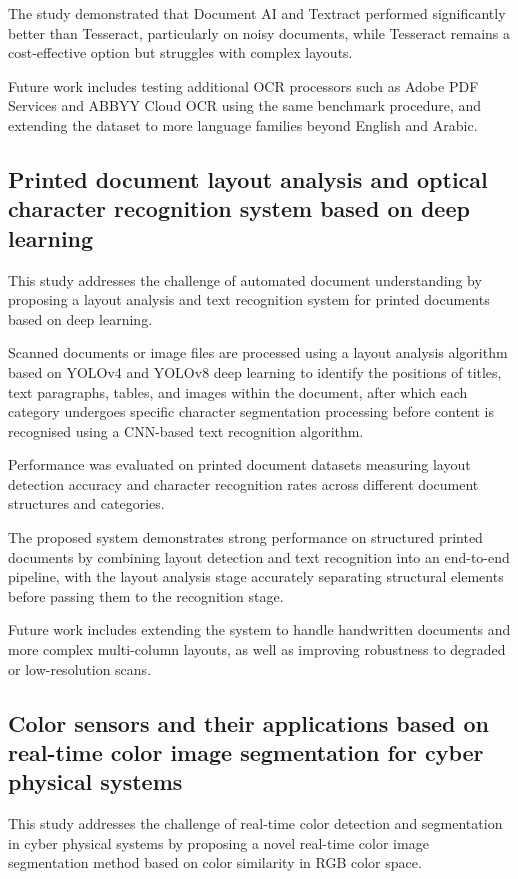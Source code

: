 The study demonstrated that Document AI and Textract performed significantly better than Tesseract, particularly on noisy documents, while Tesseract remains a cost-effective option but struggles with complex layouts. 

Future work includes testing additional OCR processors such as Adobe PDF Services and ABBYY Cloud OCR using the same benchmark procedure, and extending the dataset to more language families beyond English and Arabic.

\subsection{Printed document layout analysis and optical character recognition system based on deep learning \cite{paper_17}}
This study addresses the challenge of automated document understanding by proposing a layout analysis and text recognition system for printed documents based on deep learning. 

Scanned documents or image files are processed using a layout analysis algorithm based on YOLOv4 and YOLOv8 deep learning to identify the positions of titles, text paragraphs, tables, and images within the document, after which each category undergoes specific character segmentation processing before content is recognised using a CNN-based text recognition algorithm. 

Performance was evaluated on printed document datasets measuring layout detection accuracy and character recognition rates across different document structures and categories.

The proposed system demonstrates strong performance on structured printed documents by combining layout detection and text recognition into an end-to-end pipeline, with the layout analysis stage accurately separating structural elements before passing them to the recognition stage. 

Future work includes extending the system to handle handwritten documents and more complex multi-column layouts, as well as improving robustness to degraded or low-resolution scans.

\subsection{Color sensors and their applications based on real-time color image segmentation for cyber physical systems \cite{paper_18}}
This study addresses the challenge of real-time color detection and segmentation in cyber physical systems by proposing a novel real-time color image segmentation method based on color similarity in RGB color space. 

